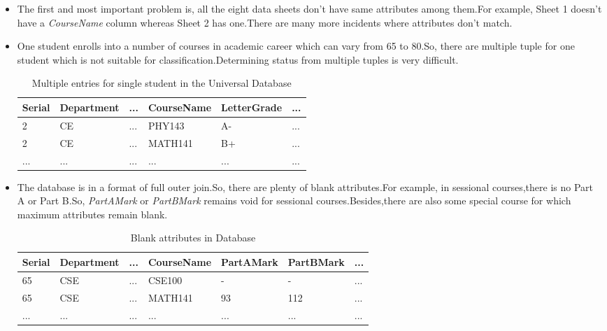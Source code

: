 \documentclass[a4paper,12pt]{book}
\begin{document}
\begin{itemize}
\item The first and most important problem is, all the eight data sheets don't have same attributes among them.For example, Sheet 1 doesn't have a \textit{CourseName} column whereas Sheet 2 has one.There are many more incidents where attributes don't match.
\item One student enrolls into a number of courses in academic career which can vary from 65 to 80.So, there are multiple tuple for one student which is not suitable for classification.Determining status from multiple tuples is very difficult.
\begin {table}[H]
\caption {Multiple entries for single student in the Universal Database} \label{tab:title} 
\begin{center}
\begin{tabular}{ | m{2cm} | m{2cm}| m{0.5cm} | m{3cm} | m{2cm} | m{0.5cm} | } 
\hline
Serial & Department & ... & CourseName & LetterGrade & ... \\ 
\hline
2 & CE & ... & PHY143 & A- & ... \\ 
\hline
2 & CE & ... & MATH141 & B+ & ... \\ 
\hline
... & ... & ... & ... & ... & ... \\ 
\hline
\end{tabular}
\end{center}
\end{table}
\item The database is in a format of full outer join.So, there are plenty of blank attributes.For example, in sessional courses,there is no Part A or Part B.So, \textit{PartAMark} or \textit{PartBMark} remains void for sessional courses.Besides,there are also some special course for which maximum attributes remain blank. 
\begin {table}[H]
\caption {Blank attributes in Database} \label{tab:title} 
\begin{center}
\begin{tabular}{ | m{1cm} | m{2cm}| m{0.5cm}| m{2cm} | m{2cm} | m{2cm} |  m{0.5cm} | } 
\hline
Serial & Department & ... & CourseName & PartAMark & PartBMark & ... \\ 
\hline
65 & CSE & ... & CSE100 & - & - & ... \\ 
\hline
65 & CSE & ... & MATH141 & 93 & 112 & ... \\ 
\hline
... & ... & ... & ... & ... & ... & ... \\ 
\hline
\end{tabular}

\end{center}
\end{table}
\end{itemize}
\end{document}
